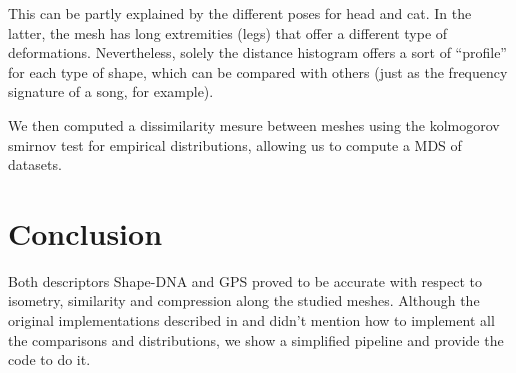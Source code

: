 \documentclass[conference]{IEEEtran}
\newcommand{\q}[1]{``#1''} %
\begin{document}
This can be partly explained by the different poses for \textsf{head} and \textsf{cat}. In the latter, the mesh has long extremities (legs) that offer a different type of deformations. Nevertheless, solely the distance histogram offers a sort of \q{profile} for each type of shape, which can be compared with others (just as the frequency signature of a song, for example).

We then computed a dissimilarity mesure between meshes using the kolmogorov smirnov test for empirical distributions, allowing us to compute a MDS of datasets.


\section{Conclusion}

Both descriptors Shape-DNA and GPS proved to be accurate with respect to isometry, similarity and compression along the studied meshes. Although the original implementations described in \cite{Rustamov07} and \cite{Reuter06} didn't mention how to implement all the comparisons and distributions, we show a simplified pipeline and provide the code to do it.


\ifCLASSOPTIONcaptionsoff
  \newpage
\fi





%
%
%

 

\end{document}
